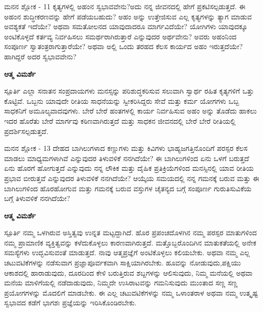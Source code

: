 \newpage
\begin{mananam}{\mananamfont ಮನನ ಶ್ಲೋಕ - \textenglish{11}}
\footnotesize \mananamtext ಕೃತ್ಯಗಳಲ್ಲಿ ಅಹಂನ ಸ್ವಭಾವವೇನು?ಅದು ನನ್ನ ಜೀವನದಲ್ಲಿ ಹೇಗೆ ಪ್ರಕಟಿಸಲ್ಪಡುತ್ತದೆ. ಈ ಅಹಂನ ಶುದ್ಧೀಕರಣವನ್ನು ಹೇಗೆ ಪಡೆಯಬಹುದು? ಅಹಂ ಅನ್ನು ಉತ್ತೇಜಿಸುವ ಎಲ್ಲ ಕೃತ್ಯಗಳನ್ನು ತ್ಯಾಗ ಮಾಡುವ ಅವಶ್ಯಕತೆ ಇದೆಯೇ? ಅಥವಾ ಸಮತೋಲನದ ಯಾವುದಾದರೂ ಮಾರ್ಗವಿದೆಯೇ? ಯೋಗಿಗಳು ಯಾವುದಕ್ಕೂ ಅಂಟಿಕೊಳ್ಳದೆ ಕರ್ತವ್ಯ ನಿರ್ವಹಿಸಲು ಸಮರ್ಥರಾಗಿರುತ್ತಾರೆ ಎನ್ನುವುದರ ಅರ್ಥವೇನು? ಅವರು ಅಹಂನಿಂದ ಸಂಪೂರ್ಣ ಸ್ವಾತಂತ್ರರಾಗುತ್ತಾರೆಯೇ? ಅಥವಾ ಅಲ್ಲಿ ಒಂದು ತರಹದ ಕೆಲಸ ಕಾರ್ಯದ ಅಹಂ ಇರುತ್ತದೆಯೇ? ಹಾಗಿದ್ದರೆ ಅದರ ಸ್ವಭಾವವೇನು?\\
\end{mananam}
\WritingHand\enspace\textbf{ಆತ್ಮ ವಿಮರ್ಶೆ}\\
\begin{inspiration}{\mananamfont ಸ್ಪೂರ್ತಿ}
\footnotesize \mananamtext ಎಲ್ಲಾ ಸನಾತನ ಸಂಪ್ರದಾಯಗಳು ಮನಸ್ಸನ್ನು ಪರಿಶುದ್ಧಕರಿಸುವ ಸಲುವಾಗಿ ಸ್ವಾರ್ಥ ರಹಿತ ಕೃತ್ಯಗಳಿಗೆ ಒತ್ತು ಕೊಟ್ಟಿವೆ. ಒಬ್ಬನು ಯಾವುದೇ ರೀತಿಯ ಸಾಧನೆಯನ್ನು ಸ್ವೀಕರಿಸಿದ್ದರು ಸೇವೆ ಮತ್ತು ಕರ್ಮ ಯೋಗಗಳು ಒಬ್ಬ ಸಾಧಕನಿಗೆ ಅಮೂಲ್ಯವಾದವುಗಳು. ಬೇರೆ ಬೇರೆ ಹಂತಗಳಲ್ಲಿ  ಕಾರ್ಯ  ನಿರ್ವಹಿಸುವ ಅಹಂ ಅನ್ನು ತೊಡೆದು ಹಾಕಲು ಇದರ ಹೊರೆತು ಬೇರೆ ಮಾರ್ಗವು ಕಠಿಣವಾಗಿರುತ್ತದೆ ಮತ್ತು ಸಾಧಕನ ಜೀವನದಲ್ಲಿ ಬೇರೆ ಬೇರೆ ರೀತಿಯಲ್ಲಿ ಪ್ರದರ್ಶಿಸಲ್ಪಡುತ್ತದೆ.
\end{inspiration}

\newpage
\begin{mananam}{\mananamfont ಮನನ ಶ್ಲೋಕ - \textenglish{13}}
\footnotesize \mananamtext ದೇಹದ ಬಾಗಿಲುಗಳಾದ ಕಣ್ಣುಗಳು ಮತ್ತು ಕಿವಿಗಳು  ಭಾಹ್ಯಜಗತ್ತಿನೊಂದಿಗೆ ಪರಸ್ಪರ ಕೆಲಸ ಮಾಡಲು ಮಾಧ್ಯಮಗಳಾಗಿವೆ ಎನ್ನುವುದರ ತಿಳುವಳಿಕೆ  ನನಗಿದೆಯೇ? ಈ ಬಾಗಿಲುಗಳಿಂದ ಏನು ಒಳಗೆ ಬರುತ್ತದೆ ಏನು ಹೊರಗೆ ಹೋಗುತ್ತದೆ ಎನ್ನುವುದು ನನ್ನ ಲೌಕಿಕ ಮತ್ತು ದೈಹಿಕ ಪ್ರತಿಕ್ರಿಯೆಗಳಿಂದ ಮನಸ್ಸಿನಲ್ಲಿ ಯಾವ ರೀತಿಯ ಪ್ರಭಾವ ಬೀರುತ್ತವೆ ಎನ್ನುವುದರ ತಿಳುವಳಿಕೆ ನನಗಿದೆಯೇ?  ಆಯ್ಕೆಯ  ಸಮಯದಲ್ಲಿ ನನ್ನ ಗಮನಕ್ಕೆ ಬರುವ ಮತ್ತು ಈ ಬಾಗಿಲುಗಳಿಂದ ಹೊರಹೋಗುವ ಮತ್ತು ಗಮನಕ್ಕೆ ಬರುವ ವಸ್ತುಗಳ ಚೈತನ್ಯದ ಬಗ್ಗೆ ಸಂಪೂರ್ಣ ಗುರುತಿಸುವಿಕೆಯ ಬಗ್ಗೆ ತಿಳುವಳಿಕೆ ನನಗಿದೆಯೇ?\\
\end{mananam}
\WritingHand\enspace\textbf{ಆತ್ಮ ವಿಮರ್ಶೆ}\\
\begin{inspiration}{\mananamfont ಸ್ಪೂರ್ತಿ}
\footnotesize \mananamtext ನಮ್ಮ ಒಳಗಿರುವ ಅಸ್ತಿತ್ವವು ಉನ್ನತ ಮಟ್ಟದ್ದಾಗಿದೆ. ಹೊರ ಪ್ರಪಂಚದೊಳಗಿನ ನಮ್ಮ ಪರಸ್ಪರ ಮಾತುಗಳಿಂದ ನಮ್ಮ ಪ್ರಾಮಾಣಿಕ ವ್ಯಕ್ತಿತ್ವವನ್ನು ಕಳೆದುಕೊಳ್ಳಲು ಕಾರಣವಾಗಿರುತ್ತದೆ. ಮತ್ತೊಬ್ಬರೊಂದಿಗಿನ ಮಾತುಕತೆಯಲ್ಲಿ ಅನೇಕ ಸಮಸ್ಯೆಗಳು ಉದ್ಭವಿಸುವಂತೆ ಮಾಡುತ್ತದೆ. ನಾವು ಆತ್ಮಪ್ರಜ್ಞೆಗೆ ಅಂಟಿಕೊಳ್ಳಲು ಕಲಿಯಬೇಕು. ಅಥವಾ ನಮ್ಮ ಎಲ್ಲ ಚಟುವಟಿಕೆಗಳನ್ನು ನಡೆಸುವಾಗ ಪ್ರಜ್ಞಾಪೂರ್ವಕವಾಗಿ   ಸಾಕ್ಷಿಯಾಗಿರಬೇಕು. ಹೂವನ್ನು ನೋಡುವುದು,ಪಕ್ಷಿಯು ಆಕಾಶದಲ್ಲಿ ಹಾರಾಡುವುದು, ದೂರದಿಂದ ಕೇಳಿ ಬರುತ್ತಿರುವ ಶಬ್ದಗಳನ್ನು ಆಲಿಸುವುದು, ನಿಮ್ಮ ಮನೆಯಲ್ಲಿ ಅಥವಾ ಮನೆಯ ಮಾಳಿಗೆಯಲ್ಲಿ ನಡೆದಾಡುವುದು, ನಿಮ್ಮದೇ ಉಸಿರಾಟವನ್ನು ಗಮನಿಸುವುದು ಮುಂತಾದ ಸಣ್ಣ ಸಣ್ಣ ಪ್ರಯೋಗಗಳನ್ನು ಮೊದಲಿಗೆ ಮಾಡಬೇಕು. ಈ ಎಲ್ಲ ಚಟುವಟಿಕೆಗಳನ್ನು ನಮ್ಮ ಒಳಾಂತರಾಳ ಅಥವಾ ನಮ್ಮ ಉತ್ಕೃಷ್ಟ ಸ್ವಭಾವದ ಕಡೆಗೆ ಭಾಗಶಃ ಪ್ರಜ್ಞೆಯನ್ನು ಇರಿಸಿಕೊಂಡಿರಬೇಕು.
\end{inspiration}
\newpage

